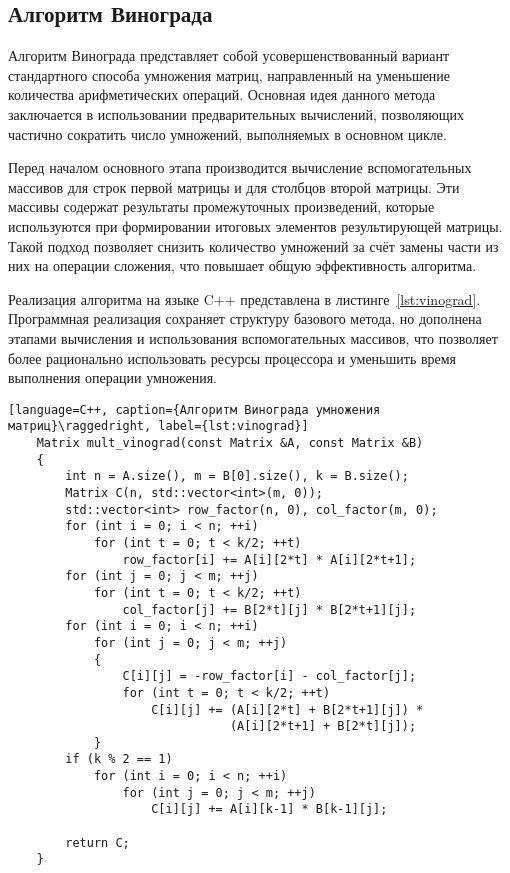 \subsection{Алгоритм Винограда}

Алгоритм Винограда представляет собой усовершенствованный вариант стандартного способа умножения матриц, направленный на уменьшение количества арифметических операций. 
Основная идея данного метода заключается в использовании предварительных вычислений, позволяющих частично сократить число умножений, выполняемых в основном цикле. 

Перед началом основного этапа производится вычисление вспомогательных массивов для строк первой матрицы и для столбцов второй матрицы. Эти массивы содержат результаты промежуточных произведений, которые используются при формировании итоговых элементов результирующей матрицы. Такой подход позволяет снизить количество умножений за счёт замены части из них на операции сложения, что повышает общую эффективность алгоритма.  

Реализация алгоритма на языке C++ представлена в листинге~\ref{lst:vinograd}. 
Программная реализация сохраняет структуру базового метода, но дополнена этапами вычисления и использования вспомогательных массивов, что позволяет более рационально использовать ресурсы процессора и уменьшить время выполнения операции умножения.


\begin{lstlisting}[language=C++, caption={Алгоритм Винограда умножения матриц}\raggedright, label={lst:vinograd}]
	Matrix mult_vinograd(const Matrix &A, const Matrix &B) 
	{
	    int n = A.size(), m = B[0].size(), k = B.size();
	    Matrix C(n, std::vector<int>(m, 0));
	    std::vector<int> row_factor(n, 0), col_factor(m, 0);
	    for (int i = 0; i < n; ++i)
	        for (int t = 0; t < k/2; ++t)
	            row_factor[i] += A[i][2*t] * A[i][2*t+1];
	    for (int j = 0; j < m; ++j)
	        for (int t = 0; t < k/2; ++t)
	            col_factor[j] += B[2*t][j] * B[2*t+1][j];
	    for (int i = 0; i < n; ++i) 
	        for (int j = 0; j < m; ++j)
	        {
	            C[i][j] = -row_factor[i] - col_factor[j];
	            for (int t = 0; t < k/2; ++t)
	                C[i][j] += (A[i][2*t] + B[2*t+1][j]) *
	                           (A[i][2*t+1] + B[2*t][j]);
	        }
	    if (k % 2 == 1) 
	        for (int i = 0; i < n; ++i)
	            for (int j = 0; j < m; ++j)
	                C[i][j] += A[i][k-1] * B[k-1][j];
	
	    return C;
	}
\end{lstlisting}

